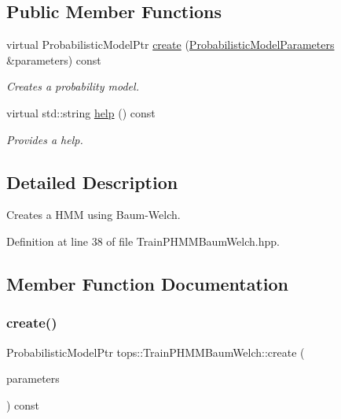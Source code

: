 \subsection*{Public Member Functions}
\begin{DoxyCompactItemize}
\item 
virtual Probabilistic\+Model\+Ptr \hyperlink{classtops_1_1TrainPHMMBaumWelch_a7e11d58b3556af7dd44a85a18743a6ba}{create} (\hyperlink{classtops_1_1ProbabilisticModelParameters}{Probabilistic\+Model\+Parameters} \&parameters) const
\begin{DoxyCompactList}\small\item\em Creates a probability model. \end{DoxyCompactList}\item 
\mbox{\label{classtops_1_1TrainPHMMBaumWelch_a5f21f35706fc8d4e9ea8fac1780ebe14}} 
virtual std\+::string \hyperlink{classtops_1_1TrainPHMMBaumWelch_a5f21f35706fc8d4e9ea8fac1780ebe14}{help} () const
\begin{DoxyCompactList}\small\item\em Provides a help. \end{DoxyCompactList}\end{DoxyCompactItemize}


\subsection{Detailed Description}
Creates a H\+MM using Baum-\/\+Welch. 

Definition at line 38 of file Train\+P\+H\+M\+M\+Baum\+Welch.\+hpp.



\subsection{Member Function Documentation}
\mbox{\label{classtops_1_1TrainPHMMBaumWelch_a7e11d58b3556af7dd44a85a18743a6ba}} 
\subsubsection{\texorpdfstring{create()}{create()}}
{\footnotesize\ttfamily Probabilistic\+Model\+Ptr tops\+::\+Train\+P\+H\+M\+M\+Baum\+Welch\+::create (\begin{DoxyParamCaption}\item[{\hyperlink{classtops_1_1ProbabilisticModelParameters}{Probabilistic\+Model\+Parameters} \&}]{parameters }\end{DoxyParamCaption}) const\hspace{0.3cm}{\ttfamily [virtual]}}



